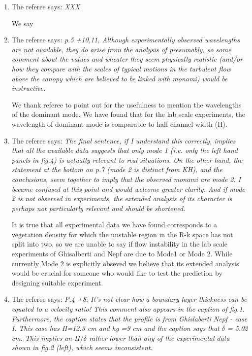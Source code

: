 \documentclass[letterpaper,10pt]{article}
\begin{document}
\begin{enumerate}
\item The referee says:
\textit{
XXX
}

We say

\item The referee says:
\textit{p.5 +10,11, Although experimentally observed wavelengths are not available, they do arise from the analysis of presumably, so some comment about the values and wheater they seem physically realistic (and/or how they compare with the scales of typical motions in the turbulent flow above the canopy which are believed to be linked with monami) would be instructive.
}

We thank referee to point out for the usefulness to mention the wavelengths of the dominant mode. We have found that for the lab scale experiments, the wavelength of dominant mode is comparable to half channel width (H). 

\item The referee says:
\textit{
The final sentence, if I understand this correctly, implies that all the
available data suggests that only mode 1 (i.e. only the left hand panels in
fig.4) is actually relevant to real situations. On the other hand, the
statement at the bottom on p.7 (mode 2 is distinct from KH), and the
conclusions, seem together to imply that the observed monami are mode 2.
I became confused at this point and would welcome greater clarity.
And if mode 2 is not observed in experiments, the extended analysis of its
character is perhaps not particularly relevant and should be shortened.
}

It is true that all experimental data we have found corresponds to a vegetation density for which the unstable region in the R-k space has not split into two, so we are unable to say if flow instability in the lab scale experiments of Ghisalberti and Nepf are due to Mode1 or Mode 2. While currently Mode 2 is explicitly obseved we believe that its extended analysis would be crucial for someone who would like to test the prediction by designing suitable experiment.

\item The referee says:
\textit{
P.4 +8:  
It's not clear how a boundary layer thickness can be equated to a velocity
ratio! This comment also appears in the caption of fig.1.
Furthermore, the caption states that the profile is from Ghislaberti Nepf
- case I. This case has H=12.3 cm and hg =9 cm and the caption says that $\delta$
= 5.02 cm. This implies an $H/\delta$ rather lower than any of the experimental
data shown in fig.2 (left), which seems inconsistent.
}


\end{enumerate}
\end{document}
